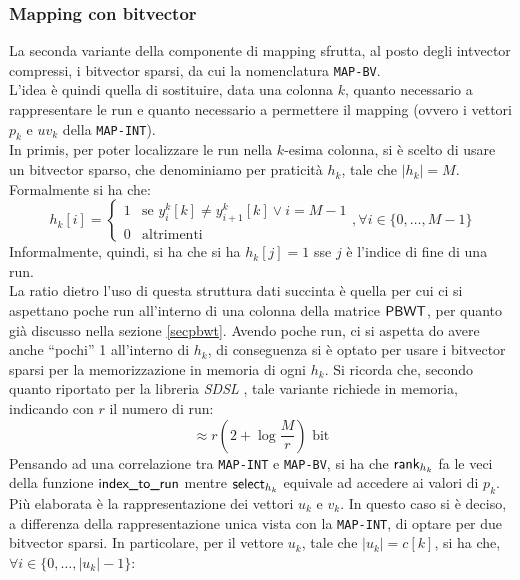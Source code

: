 \subsubsection{Mapping con bitvector}
La seconda variante della componente di mapping sfrutta, al posto degli
intvector compressi, i bitvector sparsi, da cui la nomenclatura
\texttt{MAP-BV}.\\
L'idea è quindi quella di sostituire, data una colonna $k$, quanto necessario a
rappresentare le run e quanto
necessario a permettere il mapping (ovvero i vettori $p_k$ e $uv_k$ della
\texttt{MAP-INT}).\\ 
In primis, per poter localizzare le run nella $k$-esima colonna, si è scelto di
usare un bitvector sparso, che denominiamo per praticità $h_k$, tale
che $|h_k|=M$. Formalmente si ha che:
\begin{equation}
  \label{eq:bv1}
  h_k[i]=
  \begin{cases}
    1&\mbox{se } y^k_{i}[k]\neq y^k_{i+1}[k]\lor i=M-1\\
    0&\mbox{altrimenti}
  \end{cases},\forall i\in \{0,\ldots,M-1\}
\end{equation}
Informalmente, quindi, si ha che si ha $h_k[j]=1$ sse $j$ è l'indice di fine di
una run.\\
La ratio dietro l'uso di questa struttura dati succinta è quella per cui ci si
aspettano poche run all'interno di una colonna della 
matrice $\mbox{\rm {\sf PBWT}}$, per quanto già discusso nella sezione
\ref{secpbwt}. Avendo poche run, ci si aspetta do avere anche ``pochi'' 1
all'interno di 
$h_k$, di conseguenza si è optato per usare i bitvector sparsi per la
memorizzazione in memoria di ogni $h_k$. Si ricorda che, secondo quanto
riportato per la libreria \textit{SDSL} \cite{sdsl}, tale variante richiede in
memoria, indicando con $r$ il numero di run:
\begin{equation}
  \label{eq:bv2}
  \approx r\left(2+\log\frac{M}{r}\right)\mbox{ bit}
\end{equation}
Pensando ad una correlazione tra \texttt{MAP-INT} e \texttt{MAP-BV}, si ha che
$\mbox{\rm {\sf rank}}_{h_k}$ fa le veci della funzione $\mbox{\rm {\sf index\_to\_run}}$ mentre
$\mbox{\rm {\sf select}}_{h_k}$ equivale ad accedere ai valori di $p_k$.\\
Più elaborata è la rappresentazione dei vettori $u_k$ e $v_k$. In questo caso si
è deciso, a differenza della rappresentazione unica vista con la
\texttt{MAP-INT}, di optare per due bitvector sparsi. In particolare,
per il vettore $u_k$, tale che $|u_k|=c[k]$, si ha che, $\forall
i\in\{0,\ldots,|u_k|-1\}$: 
